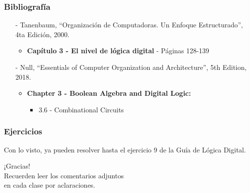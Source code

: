 \documentclass[aspectratio=169]{beamer}
\begin{document}
\begin{frame}[fragile]
    \frametitle{Bibliografía}
    \begin{itemize}
     \setlength\itemsep{0.5cm}
    \item[-] \small Tanenbaum, “Organización de Computadoras. Un Enfoque Estructurado”, 4ta Edición, 2000.\\
    \begin{itemize}
     \item \textbf{Capítulo 3 - El nivel de lógica digital} - Páginas 128-139
    \end{itemize}
    \item[-] \small Null, “Essentials of Computer Organization and Architecture”, 5th Edition, 2018.\\
    \begin{itemize}
     \item \textbf{Chapter 3 - Boolean Algebra and Digital Logic:}
     \begin{itemize}
     \item 3.6 - Combinational Circuits
     \end{itemize}
    \end{itemize}
    \end{itemize}
\end{frame}

\begin{frame}[fragile]
    \frametitle{Ejercicios}
    Con lo visto, ya pueden resolver hasta el ejercicio 9 de la Guía de Lógica Digital.
\end{frame}

\begin{frame}[plain]
    \begin{center}
    \vspace{2cm}
    \huge ¡Gracias!\\
    \vspace{2cm}
    \normalsize Recuerden leer los comentarios adjuntos\\ en cada clase por aclaraciones.
    \end{center}
\end{frame}
\end{document}
